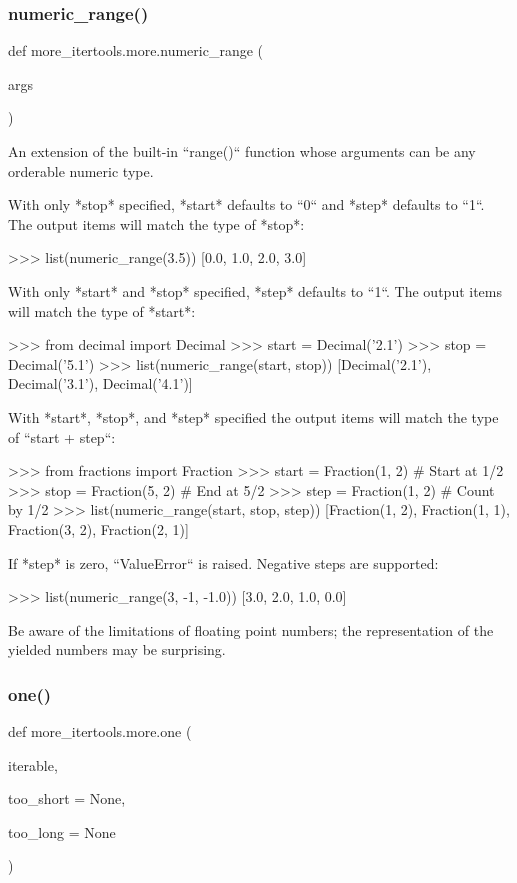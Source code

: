 \subsubsection{\texorpdfstring{numeric\+\_\+range()}{numeric\_range()}}
{\footnotesize\ttfamily def more\+\_\+itertools.\+more.\+numeric\+\_\+range (\begin{DoxyParamCaption}\item[{}]{args }\end{DoxyParamCaption})}

\begin{DoxyVerb}An extension of the built-in ``range()`` function whose arguments can
be any orderable numeric type.

With only *stop* specified, *start* defaults to ``0`` and *step*
defaults to ``1``. The output items will match the type of *stop*:

    >>> list(numeric_range(3.5))
    [0.0, 1.0, 2.0, 3.0]

With only *start* and *stop* specified, *step* defaults to ``1``. The
output items will match the type of *start*:

    >>> from decimal import Decimal
    >>> start = Decimal('2.1')
    >>> stop = Decimal('5.1')
    >>> list(numeric_range(start, stop))
    [Decimal('2.1'), Decimal('3.1'), Decimal('4.1')]

With *start*, *stop*, and *step*  specified the output items will match
the type of ``start + step``:

    >>> from fractions import Fraction
    >>> start = Fraction(1, 2)  # Start at 1/2
    >>> stop = Fraction(5, 2)  # End at 5/2
    >>> step = Fraction(1, 2)  # Count by 1/2
    >>> list(numeric_range(start, stop, step))
    [Fraction(1, 2), Fraction(1, 1), Fraction(3, 2), Fraction(2, 1)]

If *step* is zero, ``ValueError`` is raised. Negative steps are supported:

    >>> list(numeric_range(3, -1, -1.0))
    [3.0, 2.0, 1.0, 0.0]

Be aware of the limitations of floating point numbers; the representation
of the yielded numbers may be surprising.\end{DoxyVerb}
 \mbox{\label{namespacemore__itertools_1_1more_a31cba1169ac37989c9c9e24c32bc8e3f}} 
\subsubsection{\texorpdfstring{one()}{one()}}
{\footnotesize\ttfamily def more\+\_\+itertools.\+more.\+one (\begin{DoxyParamCaption}\item[{}]{iterable,  }\item[{}]{too\+\_\+short = {\ttfamily None},  }\item[{}]{too\+\_\+long = {\ttfamily None} }\end{DoxyParamCaption})}


